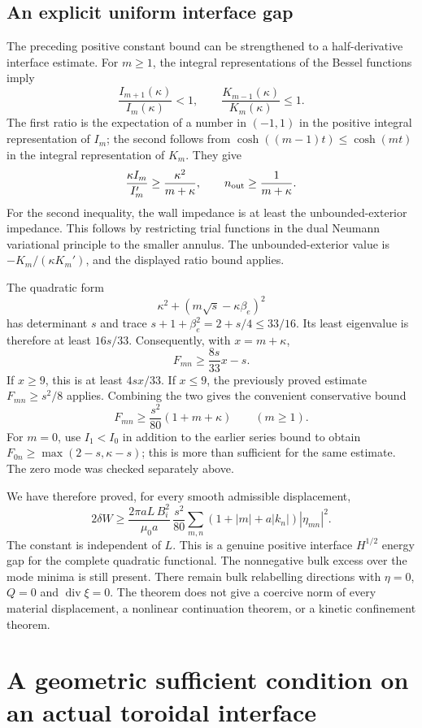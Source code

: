 \subsection{An explicit uniform interface gap}

The preceding positive constant bound can be strengthened to a
half-derivative interface estimate.  For $m\ge1$, the integral
representations of the Bessel functions imply
\[
 \frac{I_{m+1}(\kappa)}{I_m(\kappa)}<1,
 \qquad \frac{K_{m-1}(\kappa)}{K_m(\kappa)}\le1.
\]
The first ratio is the expectation of a number in $(-1,1)$ in the
positive integral representation of $I_m$; the second follows from
$\cosh((m-1)t)\le\cosh(mt)$ in the integral representation of $K_m$.
They give
\[
 \frac{\kappa I_m}{I_m'}\ge\frac{\kappa^2}{m+\kappa},
 \qquad n_{\rm out}\ge\frac{1}{m+\kappa}.
\]
For the second inequality, the wall impedance is at least the
unbounded-exterior impedance.  This follows by restricting trial
functions in the dual Neumann variational principle to the smaller
annulus.  The unbounded-exterior value is
$-K_m/(\kappa K_m')$, and the displayed ratio bound applies.

The quadratic form
\[
 \kappa^2+(m\sqrt{s}-\kappa\beta_e)^2
\]
has determinant $s$ and trace
$s+1+\beta_e^2=2+s/4\le33/16$.  Its least eigenvalue is therefore at
least $16s/33$.  Consequently, with $x=m+\kappa$,
\[
 F_{mn}\ge\frac{8s}{33}x-s.
\]
If $x\ge9$, this is at least $4sx/33$.  If $x\le9$, the previously
proved estimate $F_{mn}\ge s^2/8$ applies.  Combining the two gives
the convenient conservative bound
\[
 F_{mn}\ge\frac{s^2}{80}(1+m+\kappa)
 \qquad (m\ge1).
\]
For $m=0$, use $I_1<I_0$ in addition to the earlier series bound to
obtain $F_{0n}\ge\max(2-s,\kappa-s)$; this is more than sufficient for
the same estimate.  The zero mode was checked separately above.

We have therefore proved, for every smooth admissible displacement,
\[
 2\delta W\ge
 \frac{2\pi aL\,B_i^2}{\mu_0a}\,
 \frac{s^2}{80}
 \sum_{m,n}\left(1+|m|+a|k_n|\right)|\eta_{mn}|^2.
\]
The constant is independent of $L$.  This is a genuine positive
interface $H^{1/2}$ energy gap for the complete quadratic functional.
The nonnegative bulk excess over the mode minima is still present.
There remain bulk relabelling directions with $\eta=0$, $Q=0$ and
$\operatorname{div}\xi=0$.  The theorem does not give a coercive norm
of every material displacement, a nonlinear continuation theorem, or
a kinetic confinement theorem.

\section{A geometric sufficient condition on an actual toroidal interface}

